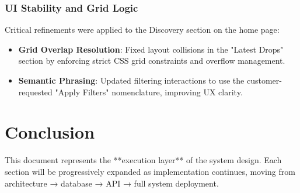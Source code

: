 \documentclass[12pt,a4paper]{article}
\begin{document}
\subsubsection{UI Stability and Grid Logic}

Critical refinements were applied to the Discovery section on the home page:

\begin{itemize}
    \item \textbf{Grid Overlap Resolution}: Fixed layout collisions in the "Latest Drops" section by enforcing strict CSS grid constraints and overflow management.
    \item \textbf{Semantic Phrasing}: Updated filtering interactions to use the customer-requested "Apply Filters" nomenclature, improving UX clarity.
\end{itemize}

\section{Conclusion}
This document represents the **execution layer** of the system design.
Each section will be progressively expanded as implementation continues, moving from architecture → database → API → full system deployment.
\end{document}
